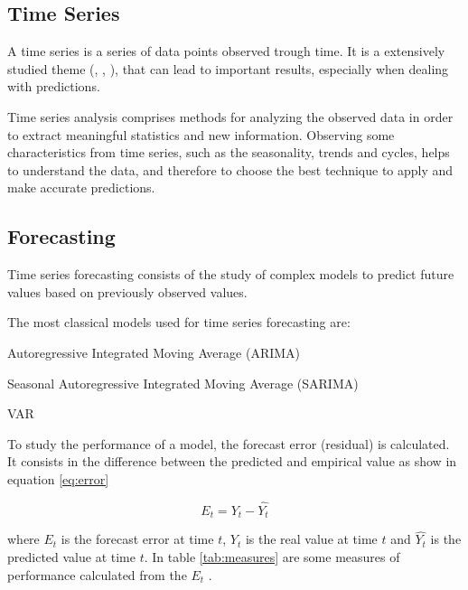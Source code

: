 \documentclass[12pt]{report}
\begin{document}
\subsection{Time Series}

A time series is a series of data points observed trough time. It is a extensively studied theme (\citet{box2015time}, \citet{tong1990non}, \citet{scharf1991statistical}), that can lead to important results, especially when dealing with predictions.

Time series analysis comprises methods for analyzing the observed data in order to extract meaningful statistics and new information. Observing some characteristics from time series, such as the seasonality, trends and cycles, helps to understand the data, and therefore to choose the best technique to apply and make accurate predictions.

\subsection{Forecasting}

Time series forecasting consists of the study of complex models to predict future values based on previously observed values.

The most classical models used for time series forecasting are:
 
 \begin{description}
  \item Autoregressive Integrated Moving Average (ARIMA)
  \item Seasonal Autoregressive Integrated Moving Average (SARIMA)
  \item VAR
 \end{description}

To study the performance of a model, the forecast error (residual) is calculated. It consists in the difference between the predicted and empirical value as show in equation \ref{eq:error}

\begin{equation}
E_t = Y_t - \hat{Y_t}
\label{eq:error}
\end{equation}

where $E_t$ is the forecast error at time $t$, $Y_t$ is the real value at time $t$ and $\hat{Y_t}$ is the predicted value at time $t$. In table \ref{tab:measures} are some measures of performance calculated from the $E_t$ .
\end{document}
